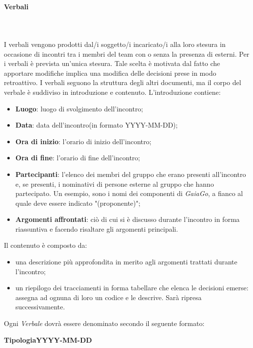 		\paragraph{Verbali} \mbox{}\\ \mbox{}\\
		I verbali vengono prodotti dal/i soggetto/i incaricato/i alla loro stesura in occasione di incontri tra i membri del team con o senza la presenza di esterni. Per i verbali è prevista un'unica stesura. Tale	scelta è motivata dal fatto che apportare modifiche implica una modifica delle decisioni prese in modo retroattivo.
		I verbali seguono la struttura degli altri documenti, ma il corpo del verbale è suddiviso in introduzione e contenuto.
		L'introduzione contiene:
		\begin{itemize}
			\item \textbf{Luogo}: luogo di svolgimento dell'incontro;
			\item \textbf{Data}: data dell'incontro(in formato YYYY-MM-DD);
			\item \textbf{Ora di inizio}: l'orario di inizio dell'incontro;
			\item \textbf{Ora di fine}: l'orario di fine dell'incontro;
			\item \textbf{Partecipanti}: l'elenco dei membri del gruppo che erano presenti all'incontro e, se presenti, i nominativi di persone esterne al gruppo che hanno partecipato. Un esempio, sono i nomi dei componenti di \textit{GaiaGo}, a fianco al quale deve essere indicato "(proponente)";
			\item \textbf{Argomenti affrontati}: ciò di cui si è discusso durante l'incontro in forma riassuntiva e facendo risaltare gli argomenti principali.
		\end{itemize}
	Il contenuto è composto da:
	\begin{itemize}
		\item una descrizione più approfondita in merito agli argomenti trattati durante l'incontro;
		\item un riepilogo dei tracciamenti in forma tabellare che elenca le decisioni emerse: assegna ad ognuna di loro un codice e le descrive. Sarà ripresa successivamente.
	\end{itemize}
		Ogni \textit{Verbale} dovrà essere denominato secondo il seguente formato: \newline \newline
		\centerline{\textbf{TipologiaYYYY-MM-DD}} \newline \newline
